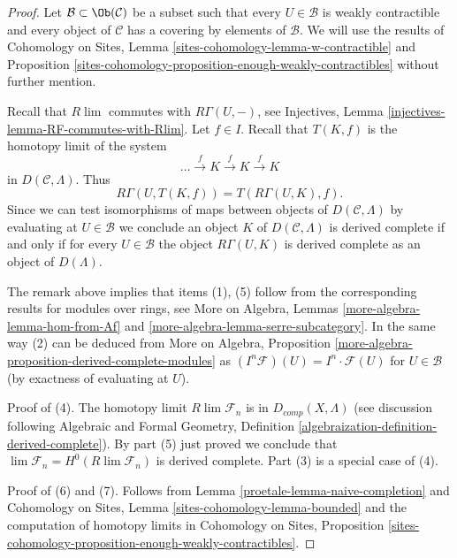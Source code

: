 \begin{proof}

Let $\mathcal{B} \subset \Ob(\mathcal{C})$ be a subset such that every
$U \in \mathcal{B}$ is weakly contractible and every object of $\mathcal{C}$
has a covering by elements of $\mathcal{B}$.
We will use the results of Cohomology on Sites,
Lemma \ref{sites-cohomology-lemma-w-contractible} and
Proposition \ref{sites-cohomology-proposition-enough-weakly-contractibles}
without further mention.

\medskip\noindent
Recall that $R\lim$ commutes with $R\Gamma(U, -)$,
see Injectives, Lemma \ref{injectives-lemma-RF-commutes-with-Rlim}.
Let $f \in I$. Recall that $T(K, f)$ is the homotopy limit
of the system
$$
\ldots \xrightarrow{f} K \xrightarrow{f} K \xrightarrow{f} K
$$
in $D(\mathcal{C}, \Lambda)$. Thus
$$
R\Gamma(U, T(K, f)) = T(R\Gamma(U, K), f).
$$
Since we can test isomorphisms of maps between objects of
$D(\mathcal{C}, \Lambda)$ by evaluating at $U \in \mathcal{B}$
we conclude an object $K$ of $D(\mathcal{C}, \Lambda)$
is derived complete if and only if for every $U \in \mathcal{B}$ the
object $R\Gamma(U, K)$ is derived complete as an object of $D(\Lambda)$.

\medskip\noindent
The remark above implies that items (1), (5) follow from the corresponding
results for modules over rings, see
More on Algebra, Lemmas \ref{more-algebra-lemma-hom-from-Af} and
\ref{more-algebra-lemma-serre-subcategory}.
In the same way (2) can be deduced from
More on Algebra, Proposition
\ref{more-algebra-proposition-derived-complete-modules}
as $(I^n\mathcal{F})(U) = I^n \cdot \mathcal{F}(U)$
for $U \in \mathcal{B}$ (by exactness of evaluating at $U$).

\medskip\noindent
Proof of (4). The homotopy limit $R\lim \mathcal{F}_n$ is in
$D_{comp}(X, \Lambda)$ (see discussion following
Algebraic and Formal Geometry, Definition
\ref{algebraization-definition-derived-complete}).
By part (5) just proved we conclude that
$\lim \mathcal{F}_n = H^0(R\lim \mathcal{F}_n)$
is derived complete.
Part (3) is a special case of (4).

\medskip\noindent
Proof of (6) and (7). Follows from
Lemma \ref{proetale-lemma-naive-completion}
and
Cohomology on Sites, Lemma \ref{sites-cohomology-lemma-bounded}
and the computation of homotopy limits in Cohomology on Sites,
Proposition \ref{sites-cohomology-proposition-enough-weakly-contractibles}.
\end{proof}

